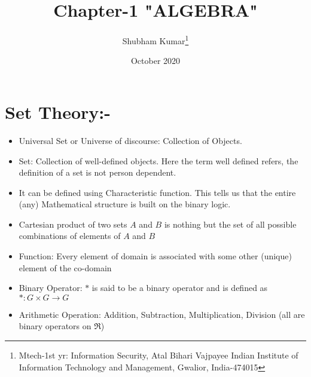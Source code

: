 \documentclass{article}
\title{Chapter-1 "ALGEBRA"}
\author{Shubham Kumar\thanks{Mtech-1st yr: Information Security, Atal Bihari Vajpayee Indian Institute of Information Technology and Management, Gwalior, India-474015} }
\date{October 2020}
\begin{document}
\maketitle

\section{Set Theory:-}
\begin{itemize}
    \item Universal Set or Universe of discourse: Collection of Objects.
	\item Set: Collection of well-defined objects. Here the term well defined refers, the definition of a set is not person dependent.
	\item It can be defined using Characteristic function. This tells us that the entire (any) Mathematical structure is built on the binary logic.
	\item Cartesian product of two sets $A$ and $B$ is nothing but the set of all possible combinations of elements of $A$ and $B$
	\item Function: Every element of domain is associated with some other (unique) element of the co-domain
	\item Binary Operator: $*$ is said to be a binary operator and is defined as $*:G \times G \rightarrow G $
	\item Arithmetic Operation: Addition, Subtraction, Multiplication, Division (all are binary operators on $\Re$)
\end{itemize}
\end{document}
